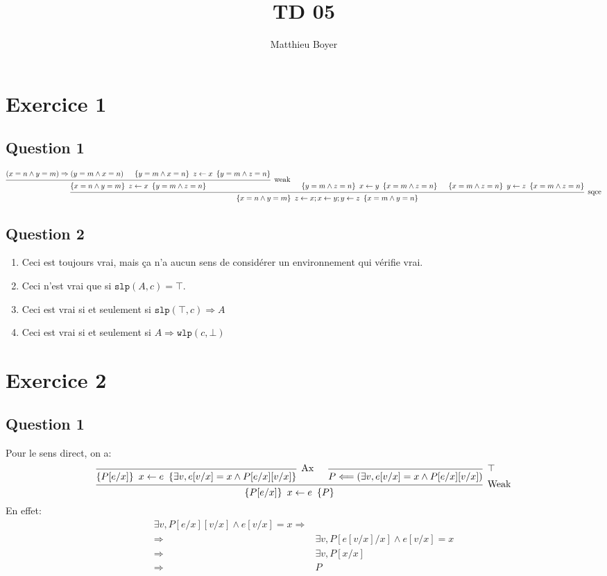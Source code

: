 \documentclass{cours}
\title{TD 05}
\author{Matthieu Boyer}
\begin{document}
\section{Exercice 1}
\subsection{Question 1}
\begin{equation*}
	\begin{prooftree}
		\hypo{\left(x = n \land y = m\right) \Rightarrow \left(y = m \land x = n\right)}
		\hypo{\hoare{y = m \land x = n}{z \gets x}{y = m \land z = n}}
		\infer2[weak]{\hoare{x = n \land y = m}{z \gets x}{y = m \land z = n}}
		\hypo{\hoare{y = m \land z = n}{x \gets y}{x = m \land z = n}}
		\hypo{\hoare{x = m \land z = n}{y \gets z}{x = m \land z = n}}
		\infer3[sqce]{\hoare{x = n \land y = m}{z \gets x; x \gets y; y \gets z}{x = m \land y = n}}
	\end{prooftree}	
\end{equation*}


\subsection{Question 2}
\begin{enumerate}
	\item Ceci est toujours vrai, mais ça n'a aucun sens de considérer un environnement qui vérifie vrai.  
	\item Ceci n'est vrai que si $\texttt{slp}(A, c) = \top$.
	\item Ceci est vrai si et seulement si $\texttt{slp}(\top, c) \Rightarrow A$
	\item Ceci est vrai si et seulement si $A \Rightarrow \texttt{wlp}(c, \bot)$
\end{enumerate}


\section{Exercice 2}
\subsection{Question 1}
Pour le sens direct, on a: 
\begin{equation*}
	\begin{prooftree}
		\infer0[Ax]{\hoare{P[e/x]}{x \gets e}{\exists v, e[v/x] = x \land P[e/x][v/x]}}
		\infer0[$\top$]{P \Longleftarrow \left(\exists v, e[v/x] = x \land P[e/x][v/x] \right) }
		\infer2[Weak]{\hoare{P[e/x]}{x \gets e}{P}}
	\end{prooftree}
\end{equation*}
En effet:
\begin{equation*}
	\begin{aligned}
		\exists v, P[e/x][v/x] \land e[v/x] = x \Longrightarrow&\\
		\Longrightarrow& \exists v, P[e[v/x]/x] \land e[v/x] = x\\
		\Longrightarrow& \exists v, P[x/x]\\
		\Longrightarrow& P
	\end{aligned}
\end{equation*}
\end{document}
